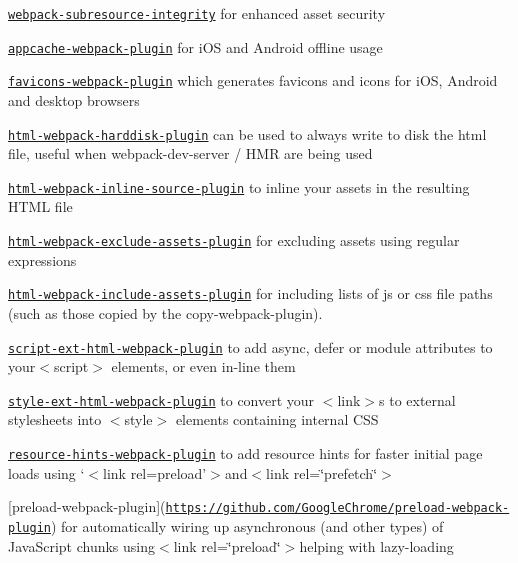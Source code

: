 \begin{DoxyItemize}
\item \href{https://www.npmjs.com/package/webpack-subresource-integrity}{\tt webpack-\/subresource-\/integrity} for enhanced asset security
\item \href{https://github.com/lettertwo/appcache-webpack-plugin}{\tt appcache-\/webpack-\/plugin} for i\+OS and Android offline usage
\item \href{https://github.com/jantimon/favicons-webpack-plugin}{\tt favicons-\/webpack-\/plugin} which generates favicons and icons for i\+OS, Android and desktop browsers
\item \href{https://github.com/jantimon/html-webpack-harddisk-plugin}{\tt html-\/webpack-\/harddisk-\/plugin} can be used to always write to disk the html file, useful when webpack-\/dev-\/server / H\+MR are being used
\item \href{https://github.com/DustinJackson/html-webpack-inline-source-plugin}{\tt html-\/webpack-\/inline-\/source-\/plugin} to inline your assets in the resulting H\+T\+ML file
\item \href{https://github.com/jamesjieye/html-webpack-exclude-assets-plugin}{\tt html-\/webpack-\/exclude-\/assets-\/plugin} for excluding assets using regular expressions
\item \href{https://github.com/jharris4/html-webpack-include-assets-plugin}{\tt html-\/webpack-\/include-\/assets-\/plugin} for including lists of js or css file paths (such as those copied by the copy-\/webpack-\/plugin).
\item \href{https://github.com/numical/script-ext-html-webpack-plugin}{\tt script-\/ext-\/html-\/webpack-\/plugin} to add {\ttfamily async}, {\ttfamily defer} or {\ttfamily module} attributes to your{\ttfamily $<$script$>$} elements, or even in-\/line them
\item \href{https://github.com/numical/style-ext-html-webpack-plugin}{\tt style-\/ext-\/html-\/webpack-\/plugin} to convert your {\ttfamily $<$link$>$}s to external stylesheets into {\ttfamily $<$style$>$} elements containing internal C\+SS
\item \href{https://github.com/jantimon/resource-hints-webpack-plugin}{\tt resource-\/hints-\/webpack-\/plugin} to add resource hints for faster initial page loads using `$<$link rel=\textquotesingle{}preload'$>${\ttfamily and}$<$link rel=\char`\"{}prefetch\char`\"{}$>${\ttfamily }
\item {\ttfamily \mbox{[}preload-\/webpack-\/plugin\mbox{]}(\href{https://github.com/GoogleChrome/preload-webpack-plugin}{\tt https\+://github.\+com/\+Google\+Chrome/preload-\/webpack-\/plugin}) for automatically wiring up asynchronous (and other types) of Java\+Script chunks using}$<$link rel=\char`\"{}preload\char`\"{}$>${\ttfamily helping with lazy-\/loading}

\end{DoxyItemize}
